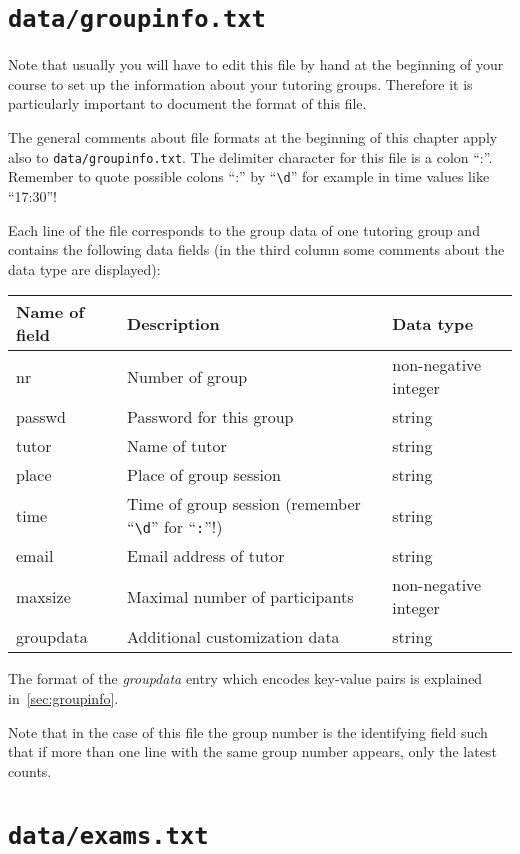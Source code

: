 \documentclass[12pt,openany,a4paper]{book}
\begin{document}
\section{\texttt{data/groupinfo.txt}}
\label{sec:groupinfo.txt}

Note that usually you will have to edit this file by hand at the beginning
of your course to set up the information about your tutoring groups. 
Therefore it is particularly important to document the format of this file.

The general comments about file formats at the beginning of this chapter
apply also to \texttt{data/groupinfo.txt}. The delimiter character for this
file is a colon ``:''. Remember to quote possible colons ``:'' by
``\verb!\d!'' for example in time values like ``17:30''!

Each line of the file corresponds to the group data of one
tutoring group and contains the following data fields (in the third column
some comments about the data type are displayed):

\begin{center}
\begin{tabular}{|l|l|l|}
\hline
Name of field & Description & Data type \\
\hline
\hline
nr & Number of group & non-negative integer \\
\hline
passwd & Password for this group & string \\
\hline
tutor & Name of tutor & string \\
\hline
place & Place of group session & string \\
\hline
time & Time of group session (remember ``\verb!\d!'' for ``\verb!:!''!) 
     & string \\
\hline
email & Email address of tutor & string \\
\hline
maxsize & Maximal number of participants & non-negative integer \\
\hline
groupdata & Additional customization data & string \\
\hline
\end{tabular}
\end{center}

The format of the \emph{groupdata} entry which encodes key-value pairs is
explained in~\ref{sec:groupinfo}.

Note that in the case of this file the group number is the identifying
field such that if more than one line with the same group number appears,
only the latest counts.

\section{\texttt{data/exams.txt}}
\label{sec:exams.txt}
\end{document}
